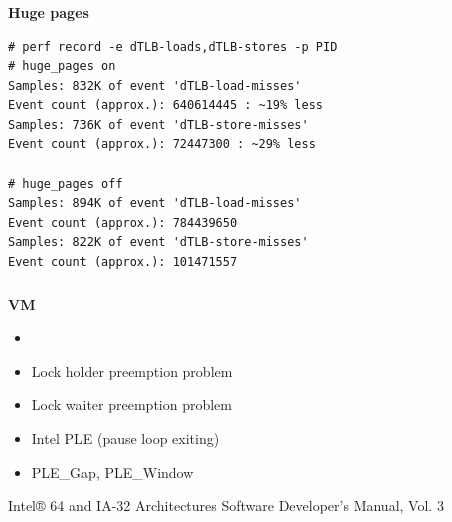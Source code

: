 \documentclass[usenames,dvipsnames, 18pt, compress, aspectratio=169]{beamer}
\begin{document}
\begin{frame}[fragile]{}
    \frametitle{}
    \begin{center}
        \textbf{Huge pages}

        \begin{flushleft}
		\begin{verbatim}
# perf record -e dTLB-loads,dTLB-stores -p PID
# huge_pages on
Samples: 832K of event 'dTLB-load-misses'
Event count (approx.): 640614445 : ~19% less
Samples: 736K of event 'dTLB-store-misses'
Event count (approx.): 72447300 : ~29% less

# huge_pages off
Samples: 894K of event 'dTLB-load-misses'
Event count (approx.): 784439650
Samples: 822K of event 'dTLB-store-misses'
Event count (approx.): 101471557
        \end{verbatim}
        \end{flushleft}

    \end{center}
\end{frame}

\begin{frame}
    \frametitle{}
    \begin{center}
    \textbf{VM}

        \begin{itemize}
            \item <+->
        \end{itemize}

        \begin{itemize}[label={\MVRightarrow}]
            \item Lock holder preemption problem
            \item Lock waiter preemption problem
            \item Intel PLE (pause loop exiting)
            \item PLE\_Gap, PLE\_Window
        \end{itemize}

        \normalsize{Intel® 64 and IA-32 Architectures Software Developer's Manual, Vol. 3}
    \end{center}
\end{frame}
\end{document}
